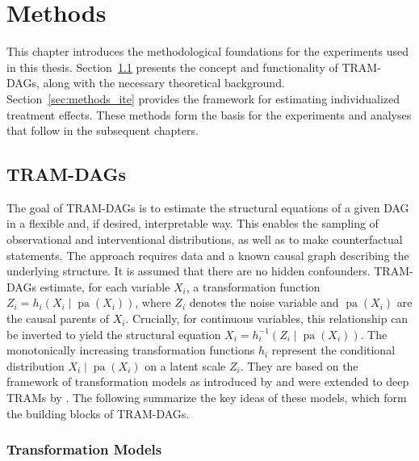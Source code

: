 




\chapter{Methods}

This chapter introduces the methodological foundations for the experiments used in this thesis. Section~\ref{sec:methods_tram_dags} presents the concept and functionality of TRAM-DAGs, along with the necessary theoretical background. Section~\ref{sec:methods_ite} provides the framework for estimating individualized treatment effects.  These methods form the basis for the experiments and analyses that follow in the subsequent chapters.



\section{TRAM-DAGs} \label{sec:methods_tram_dags}

The goal of TRAM-DAGs is to estimate the structural equations of a given DAG in a flexible and, if desired, interpretable way. This enables the sampling of observational and interventional distributions, as well as to make counterfactual statements. The approach requires data and a known causal graph describing the underlying structure. It is assumed that there are no hidden confounders. TRAM-DAGs estimate, for each variable $X_i$, a transformation function $Z_i = h_i(X_i \mid \operatorname{pa}(X_i))$, where $Z_i$ denotes the noise variable and $\operatorname{pa}(X_i)$ are the causal parents of $X_i$. Crucially, for continuous variables, this relationship can be inverted to yield the structural equation $X_i = h_i^{-1}(Z_i \mid \operatorname{pa}(X_i))$. The monotonically increasing transformation functions $h_i$ represent the conditional distribution  $X_i \mid \operatorname{pa}(X_i)$ on a latent scale $Z_i$. They are based on the framework of transformation models as introduced by \citet{hothorn2014} and were extended to deep TRAMs by \citet{sick2020}. The following summarize the key ideas of these models, which form the building blocks of TRAM-DAGs.


\subsection{Transformation Models}


